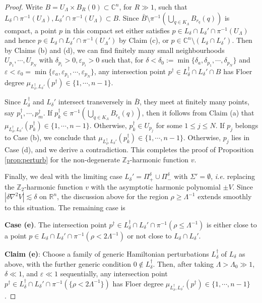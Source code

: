 \documentclass[11pt,a4paper]{article}
\numberwithin{equation}{section}%
\theoremstyle{definition}
\newcommand{\ie}{\emph{i.e.} }
\newcommand{\R}{\mathbb{R}}
\newcommand{\C}{\mathbb{C}}
\newcommand{\Z}{\mathbb{Z}}
\begin{document}
\begin{proof}
Write $ B= U_{\Lambda}\times B_R(0)\subset \C^n$, for $R\gg 1$, such that $L_\delta\cap {\pi^{-1}(U_{\Lambda})},L_{\delta}'\cap {\pi^{-1}(U_{\Lambda})}\subset B$. Since $\bar B\setminus \pi^{-1}(\bigcup\limits_{q\in K_\Lambda}B_{r_q}(q))$ is compact, a point $p$ in this compact set either satisfies
$p\in L_\delta \cap L_\delta'\cap \pi^{-1}(U_{\Lambda})$ and hence $p\in L_\delta \cap L_\delta'\cap \pi^{-1}(U_{\Lambda}')$ by Claim (c), or $p \in \C^n \setminus (L_\delta \cap L_\delta')$. Then by Claims (b) and (d), we can find finitely many small neighbourhoods $U_{p_1},\cdots,U_{p_N}$ with $\delta_{p_i}>0,\varepsilon_{p_i}>0$ such that, for $\delta<\delta_0:=\min\{\delta_a,\delta_{p_1},\cdots,\delta_{p_N}\}$ and $\varepsilon<\varepsilon_0=\min\{\varepsilon_a,\varepsilon_{p_1},\cdots,\varepsilon_{p_N}\}$,
any intersection point $p^\dagger \in L_\delta^\dagger\cap L_\delta'\cap B$ has Floer degree $\mu_{L_\delta^\dagger, L_\delta'}(p^\dagger)\in \{1,\cdots,n-1\}$. 

Since $L^{\dagger}_\delta$ and $L_\delta'$ intersect transversely in $\bar B$, they meet at finitely many points, say $p_1^{\dagger},\cdots,p_m^{\dagger}$. If $p_k^{\dagger}\in \pi^{-1}(\bigcup\limits_{q\in K_\Lambda}B_{r_q}(q))$, then it follows from Claim (a) that $\mu_{L_\delta^\dagger, L_\delta'}(p^\dagger_k)\in \{1,\cdots,n-1\}$. Otherwise, $p_k^{\dagger}\in U_{p_j}$ for some $1\leqslant j\leqslant N$. If $p_j$ belongs to Case (b), we conclude that $\mu_{L_\delta^\dagger, L_\delta'}(p^\dagger_k)\in \{1,\cdots,n-1\}$. Otherwise, $p_j$ lies in Case (d), and we derive a contradiction. This completes the proof of Proposition \ref{prop:perturb} for the non-degenerate $\Z_2$-harmonic function $v$. 

Finally, we deal with the limiting case  $L_{\delta}'=\Pi_+^\delta\cup \Pi_-^\delta$ with $\Sigma'=\emptyset$, \ie replacing the $\Z_2$-harmonic function $v$ with the asymptotic harmonic polynomial $\pm V$. Since $|\delta\nabla^2 V|\lesssim \delta$ on $\R^n$, the discussion above for the region $\rho\geqslant \Lambda^{-1}$ extends smoothly to this situation. The remaining case is

\textbf{Case (e)}. The intersection point $p^\dagger\in L_\delta^\dagger\cap L_\delta' \cap \pi^{-1}(\rho\leqslant \Lambda^{-1})$ is either close to a point $p\in L_\delta\cap L_\delta'\cap \pi^{-1}(\rho <2\Lambda^{-1})$ or not close to $L_\delta \cap L_\delta'$. 

\textbf{Claim (e)}: Choose a family of generic Hamiltonian perturbations $L_\delta^\dagger$ of $L_\delta$ as above, with the further generic condition $0\notin L_\delta^\dagger$. Then, after taking $\Lambda>\Lambda_0\gg 1$, $\delta \ll 1$, and $\varepsilon \ll1$ sequentially, any intersection point $p^\dagger \in L_\delta^{\dagger}\cap L_\delta' \cap \pi^{-1}(\{\rho<2\Lambda^{-1}\})$ has Floer degree $\mu_{L_\delta^{\dagger}, L_\delta'}(p^\dagger)\in \{1,\cdots,n-1\}$.  


\end{proof}
\end{document}
